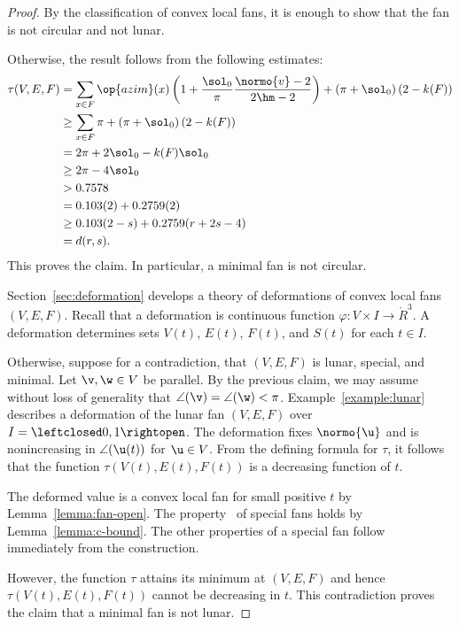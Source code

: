 \begin{proof}
  By the classification of convex local fans, it is enough to show
  that the fan is not circular and not lunar.

Otherwise, the result follows from the following estimates:
\begin{align*}
  \tau(V,E,F) &=\sum_{x\in F} \op{azim}(x)
  \left(1 + \dfrac{\sol_0}{\pi}  \dfrac{\normo{v}-2}{2\hm-2}\right) 
+ \left(\pi+{\sol_0}\right) (2- k(F))\\
  &\ge \sum_{x\in F} \pi + \left(\pi+{\sol_0}\right) (2- k(F))\\
  &= 2\pi + 2\sol_0 - k(F) \sol_0\\
  &\ge 2\pi - 4\sol_0\\
  &> 0.7578\\
  &=0.103 (2) + 0.2759 (2)\\
  &\ge 0.103 (2-s) + 0.2759 (r+2s-4) \\ 
  &= d(r,s).
\end{align*}
This proves the claim.  In particular, a minimal fan is not circular.


Section~\ref{sec:deformation} develops a theory of deformations of
convex local fans $(V,E,F)$.  Recall that a deformation is continuous
function $\varphi:V\times I\to\ring{R}^3$.  A deformation determines
sets $V(t)$, $E(t)$, $F(t)$, and $S(t)$ for each $t\in I$.


  Otherwise, suppose for a
contradiction, that $(V,E,F)$ is lunar, special, and minimal.  Let
$\v,\w\in V$ be parallel.  By the previous claim, we may assume
without loss of generality that $\angle(\v)=\angle(\w)<\pi$.
Example~\ref{example:lunar} describes a deformation of the lunar fan
$(V,E,F)$ over $I=\leftclosed0,1\rightopen$.  The deformation fixes
$\normo{\u}$ and is nonincreasing in $\angle(\u(t))$ for $\u\in V$.
From the defining formula for $\tau$, it follows that the function
$\tau(V(t),E(t),F(t))$ is a decreasing function of $t$.

  The deformed value is a convex local fan for small positive
$t$ by Lemma~\ref{lemma:fan-open}.  The property~ of
special fans holds by Lemma~\ref{lemma:c-bound}.  The other properties
of a special fan follow immediately from the construction.

However, the function $\tau$ attains its minimum at $(V,E,F)$ and
hence $\tau(V(t),E(t),F(t))$ cannot be decreasing in $t$.  This
contradiction proves the claim that a minimal fan is not lunar.
\end{proof}

